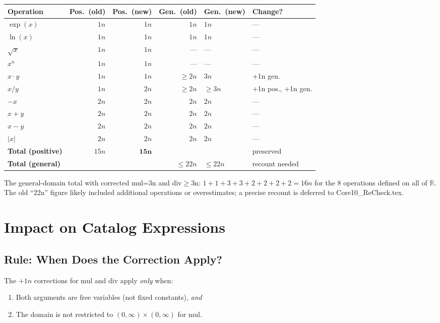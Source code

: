 \documentclass[11pt]{article}
\newcommand{\ok}[1]{\textcolor{correct}{#1}}
\newcommand{\bad}[1]{\textcolor{flagged}{#1}}
\newcommand{\warn}[1]{\textcolor{warn}{#1}}
\begin{document}
\begin{center}
\begin{tabular}{lrrrll}
\toprule
Operation & Pos.\ (old) & Pos.\ (new) & Gen.\ (old) & Gen.\ (new) & Change? \\
\midrule
$\exp(x)$      & $1n$ & $1n$ & $1n$      & $1n$      & --- \\
$\ln(x)$       & $1n$ & $1n$ & $1n$      & $1n$      & --- \\
$\sqrt{x}$     & $1n$ & $1n$ & ---       & ---       & --- \\
$x^n$          & $1n$ & $1n$ & ---       & ---       & --- \\
$x \cdot y$    & $1n$ & $1n$ & $\geq 2n$ & \bad{$3n$} & \bad{+1n gen.} \\
$x / y$        & \warn{$1n$} & \ok{$2n$} & $\geq 2n$ & \bad{$\geq 3n$} & \bad{+1n pos., +1n gen.} \\
$-x$           & $2n$ & $2n$ & $2n$      & $2n$      & --- \\
$x + y$        & $2n$ & $2n$ & $2n$      & $2n$      & --- \\
$x - y$        & $2n$ & $2n$ & $2n$      & $2n$      & --- \\
$|x|$          & $2n$ & $2n$ & $2n$      & $2n$      & --- \\
\midrule
\textbf{Total (positive)} & $15n$ & $\mathbf{15n}$ & & & \ok{preserved} \\
\textbf{Total (general)}  & & & $\leq 22n$ & $\leq 22n$ & recount needed \\
\bottomrule
\end{tabular}
\end{center}

\noindent The general-domain total with corrected mul=3n and div$\geq$3n:
$1+1+3+3+2+2+2+2 = 16n$ for the 8 operations defined on all of $\mathbb{R}$.
The old ``22n'' figure likely included additional operations or overestimates;
a precise recount is deferred to Core10\_ReCheck.tex.

\section{Impact on Catalog Expressions}

\subsection{Rule: When Does the Correction Apply?}

The $+1n$ corrections for mul and div apply \emph{only} when:
\begin{enumerate}
  \item Both arguments are free variables (not fixed constants), \emph{and}
  \item The domain is not restricted to $(0,\infty) \times (0,\infty)$ for mul.
\end{enumerate}
\end{document}
